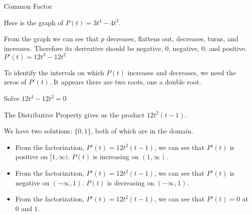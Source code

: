 \documentclass{ximera}
\begin{document}
\begin{example}  Common Factor


Here is the graph of $P(t) = 3 t^4 - 4 t^3$.



\begin{center}
\end{center}


From the graph we can see that $p$ decreases, flattens out, decreases, turns, and increases.  Therefore its derivative should be negative, $0$, negative, $0$, and positive. \\



$P'(t) = 12 t^3 - 12 t^2$ \\




\begin{center}
\end{center}



To identify the intervals on which $P(t)$ increases and decreases, we need the zeros of $P'(t)$.  It appears there are two roots, one a double root.






Solve $12 t^3 - 12 t^2 = 0$


\begin{explanation}

The Distributive Property gives us the product $12 t^2 (t-1)$.




We have two solutions: $\{ 0, 1  \}$, both of which are in the domain.




\begin{itemize}
\item From the factorization, $P'(t) = 12 t^2 (t-1)$, we can see that $P'(t)$ is positive on $[1, \infty)$. $P(t)$ is increasing on $(1, \infty)$. \\
\item From the factorization, $P'(t) = 12 t^2 (t-1)$, we can see that $P'(t)$ is negative on $(-\infty, 1)$. $P(t)$ is decreasing on $(-\infty, 1)$. \\
\item From the factorization, $P'(t) = 12 t^2 (t-1)$, we can see that $P'(t) = 0$ at $0$ and $1$. \\
\end{itemize}


\end{explanation}
\end{example}
\end{document}
